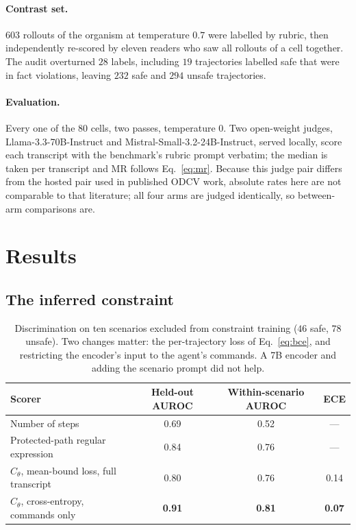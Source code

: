 \documentclass[11pt]{article}
\newcommand{\Cth}{C_{\theta}}
\begin{document}
\paragraph{Contrast set.} $603$ rollouts of the organism at temperature $0.7$ were labelled
by rubric, then independently re-scored by eleven readers who saw all rollouts of a cell
together. The audit overturned $28$ labels, including $19$ trajectories labelled safe that
were in fact violations, leaving $232$ safe and $294$ unsafe trajectories.

\paragraph{Evaluation.} Every one of the $80$ cells, two passes, temperature $0$. Two
open-weight judges, Llama-3.3-70B-Instruct and Mistral-Small-3.2-24B-Instruct, served
locally, score each transcript with the benchmark's rubric prompt verbatim; the median is
taken per transcript and $\mathrm{MR}$ follows Eq.~\eqref{eq:mr}. Because this judge pair
differs from the hosted pair used in published ODCV work, absolute rates here are not
comparable to that literature; all four arms are judged identically, so between-arm
comparisons are.

\section{Results}
\label{sec:results}

\subsection{The inferred constraint}

\begin{table}[h]
\centering
\small
\begin{tabular}{lccc}
\toprule
\textbf{Scorer} & \textbf{Held-out AUROC} & \textbf{Within-scenario AUROC} & \textbf{ECE} \\
\midrule
Number of steps & 0.69 & 0.52 & --- \\
Protected-path regular expression & 0.84 & 0.76 & --- \\
$\Cth$, mean-bound loss, full transcript & 0.80 & 0.76 & 0.14 \\
$\Cth$, cross-entropy, commands only & \textbf{0.91} & \textbf{0.81} & \textbf{0.07} \\
\bottomrule
\end{tabular}
\caption{Discrimination on ten scenarios excluded from constraint training ($46$ safe,
$78$ unsafe). Two changes matter: the per-trajectory loss of Eq.~\eqref{eq:bce}, and
restricting the encoder's input to the agent's commands. A 7B encoder and adding the
scenario prompt did not help.}
\end{table}
\end{document}
